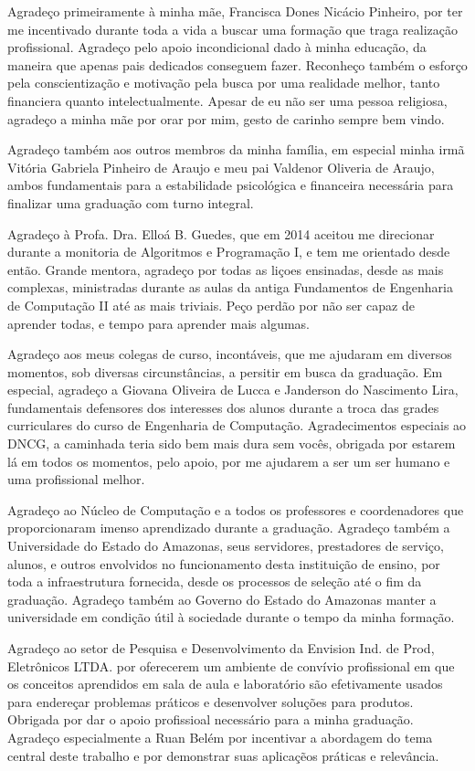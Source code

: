 Agradeço primeiramente à minha mãe, Francisca Dones Nicácio Pinheiro, por ter me incentivado durante toda a vida a buscar uma formação que traga realização profissional. Agradeço pelo apoio incondicional dado à minha educação, da maneira que apenas pais dedicados conseguem fazer. Reconheço também o esforço pela conscientização e motivação pela busca por uma realidade melhor, tanto financiera quanto intelectualmente. Apesar de eu não ser uma pessoa religiosa, agradeço a minha mãe por orar por mim, gesto de carinho sempre bem vindo.

Agradeço também aos outros membros da minha família, em especial minha irmã Vitória Gabriela Pinheiro de Araujo e meu pai Valdenor Oliveria de Araujo, ambos fundamentais para a estabilidade psicológica e financeira necessária para finalizar uma graduação com turno integral.

Agradeço à Profa. Dra. Elloá B. Guedes, que em 2014 aceitou me direcionar durante a monitoria de Algoritmos e Programação I, e tem me orientado desde então. Grande mentora, agradeço por todas as liçoes ensinadas, desde as mais complexas, ministradas durante as aulas da antiga Fundamentos de Engenharia de Computação II até as mais triviais. Peço perdão por não ser capaz de aprender todas, e tempo para aprender mais algumas.

Agradeço aos meus colegas de curso, incontáveis, que me ajudaram em diversos momentos, sob diversas circunstâncias, a persitir em busca da graduação. Em especial, agradeço a Giovana Oliveira de Lucca e Janderson do Nascimento Lira, fundamentais defensores dos interesses dos alunos durante a troca das grades curriculares do curso de Engenharia de Computação. Agradecimentos especiais ao DNCG, a caminhada teria sido bem mais dura sem vocês, obrigada por estarem lá em todos os momentos, pelo apoio, por me ajudarem a ser um ser humano e uma profissional melhor.

Agradeço ao Núcleo de Computação e a todos os professores e coordenadores que proporcionaram imenso aprendizado durante a graduação. Agradeço também a Universidade do Estado do Amazonas, seus servidores, prestadores de serviço, alunos, e outros envolvidos no funcionamento desta instituição de ensino, por toda a infraestrutura fornecida, desde os processos de seleção até o fim da graduação. Agradeço também ao Governo do Estado do Amazonas manter a universidade em condição útil à sociedade durante o tempo da minha formação.

Agradeço ao setor de Pesquisa e Desenvolvimento da Envision Ind. de Prod, Eletrônicos LTDA. por oferecerem um ambiente de convívio profissional em que os conceitos aprendidos em sala de aula e laboratório são efetivamente usados para endereçar problemas práticos e desenvolver soluções para produtos. Obrigada por dar o apoio profissioal necessário para a minha graduação. Agradeço especialmente a Ruan Belém por incentivar a abordagem do tema central deste trabalho e por demonstrar suas aplicaçẽos práticas e relevância.

